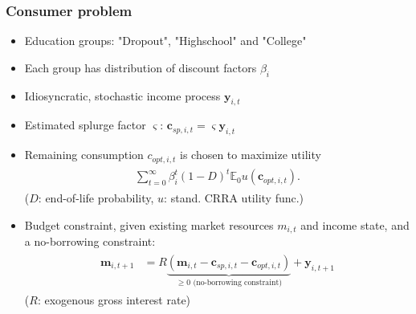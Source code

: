 \documentclass[pdflatex,aspectratio=169]{beamer}
\begin{document}
    \begin{frame}
      \frametitle{Consumer problem}


      \begin{itemize}[<+->]
      \item Education groups: "Dropout", "Highschool" and "College"
      \item Each group has distribution of discount factors $\beta_i$
      \item Idiosyncratic, stochastic income process $\mathbf{y}_{i,t}$
      \item Estimated splurge factor $\varsigma$: $\mathbf{c}_{sp,i,t} = \varsigma \mathbf{y}_{i,t}$
        \pause
      \item Remaining consumption $c_{opt,i,t}$ is chosen to maximize utility
        \begin{equation}\begin{gathered}\begin{aligned}
          \sum_{t=0}^{\infty}\beta_i^t (1-D)^t \mathbb{E}_0 u(\mathbf{c}_{opt,i,t}).
        \end{aligned}\end{gathered}\end{equation}
        ($D$: end-of-life probability, $u$: stand.
CRRA utility func.)	
      \item Budget constraint, given existing market resources $m_{i,t}$ and income state, and a no-borrowing constraint: 
        \begin{equation}\begin{gathered}\begin{aligned}
          \mathbf{m}_{i,t+1} &= R \underbrace{(\mathbf{m}_{i,t} - \mathbf{c}_{sp,i,t} - \mathbf{c}_{opt,i,t})}_{\geq 0 \text{ (no-borrowing constraint)}} + \mathbf{y}_{i,t+1}
        \end{aligned}\end{gathered}\end{equation}
        ($R$: exogenous gross interest rate)
      \end{itemize}



    \end{frame}
\end{document}
